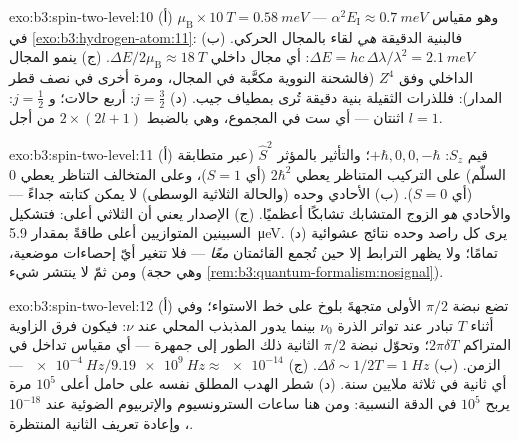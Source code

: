 \begin{solution}{exo:b3:spin-two-level:10}
(أ) $\mu_{\text{B}} \times \qty{10}{T} = \qty{0.58}{meV}$ --- وهو
مقياس $\alpha^2E_{\text{I}} \approx \qty{0.7}{meV}$ في
\cref{exo:b3:hydrogen-atom:11}: فالبنية الدقيقة \emph{هي} لقاء
 بالمجال الحركي. (ب) $\Delta E = hc\,\Delta\lambda/
\lambda^2 = \qty{2.1}{meV}$: أي مجال داخلي $\Delta E/2\mu_{
\text{B}} \approx \qty{18}{T}$. (ج) ينمو المجال الداخلي وفق
$Z^4$ (فالشحنة النووية مكعَّبة في المجال، ومرة أخرى في نصف قطر
المدار): فللذرات الثقيلة بنية دقيقة تُرى بمطياف
جيب. (د) $j = \tfrac32$: أربع حالات؛ و $j = \tfrac12$: اثنتان
--- أي ست في المجموع، وهي بالضبط $2 \times (2l + 1)$ من أجل $l = 1$.
\end{solution}

\begin{solution}{exo:b3:spin-two-level:11}
(أ) قيم $S_z$: $+\hbar, 0, 0, -\hbar$؛ والتأثير بالمؤثر $\hat S^2$
(عبر متطابقة السلّم) على التركيب المتناظر يعطي
$2\hbar^2$ (أي $S = 1$)، وعلى المتخالف التناظر يعطي $0$ (أي $S = 0$). (ب)
الأحادي وحده (والحالة الثلاثية الوسطى) لا يمكن كتابته
جداءً --- والأحادي \emph{هو} الزوج المتشابك تشابكًا
أعظميًا. (ج) الإصدار يعني أن الثلاثي أعلى: فتشكيل السبينين
المتوازيين أعلى طاقةً بمقدار \qty{5.9}{\micro eV}. (د)
يرى كل راصد وحده نتائج عشوائية تمامًا؛ ولا يظهر
الترابط إلا حين تُجمع القائمتان \emph{معًا}
--- فلا تتغير أيّ إحصاءات موضعية، ومن ثمّ لا ينتشر شيء
(وهي حجة \cref{rem:b3:quantum-formalism:nosignal}).
\end{solution}

\begin{solution}{exo:b3:spin-two-level:12}
(أ) تضع نبضة $\pi/2$ الأولى متجهةَ بلوخ على خط الاستواء؛ وفي أثناء
$T$ تبادر عند تواتر الذرة $\nu_0$ بينما يدور المذبذب
المحلي عند $\nu$: فيكون فرق الزاوية المتراكم
$2\pi\delta T$؛ وتحوّل نبضة $\pi/2$ الثانية ذلك الطور إلى
جمهرة --- أي مقياس تداخل في الزمن. (ب) $\Delta\delta \sim
1/2T = \qty{1}{Hz}$. (ج) $\qty{e-4}{Hz}/\qty{9.19e9}{Hz} \approx
\num{e-14}$ --- أي ثانية في ثلاثة ملايين سنة. (د) شطر الهدب
المطلق نفسه على حامل أعلى $10^5$ مرة يربح
$10^5$ في الدقة النسبية: ومن هنا ساعات السترونسيوم والإتربيوم
الضوئية عند $10^{-18}$، وإعادة تعريف الثانية المنتظرة.
\end{solution}

